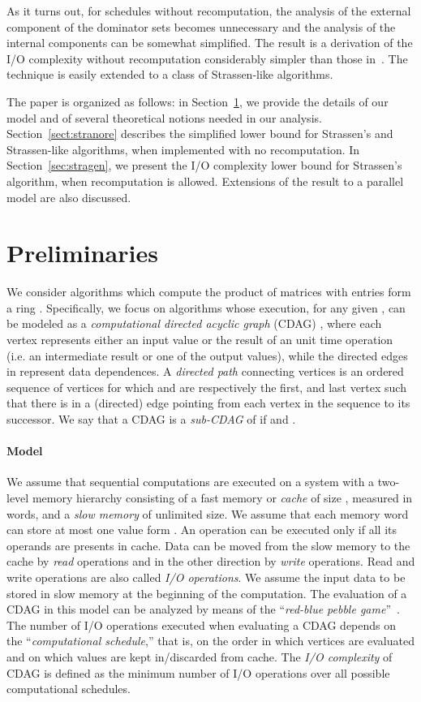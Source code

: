 \documentclass[a4paper,UKenglish]{lipics-v2016}
\newcommand{\io }{I/O }
\begin{document}
As it turns out, for schedules without recomputation, the analysis of
the external component of the dominator sets becomes unnecessary and
the analysis of the internal components can be somewhat simplified.
The result is a derivation of the \io complexity without recomputation
considerably simpler than those in~\cite{ballard2012graph,
  scott2015matrix}.  The technique is easily extended to a class of
Strassen-like algorithms.

The paper is organized as follows: in Section~\ref{sec:preliminaries},
we provide the details of our model and of several theoretical notions
needed in our analysis. Section~\ref{sect:stranore} describes the
simplified lower bound for Strassen's and Strassen-like algorithms,
when implemented with no recomputation. In Section~\ref{sec:stragen}, we present
the \io complexity lower bound for Strassen's algorithm, when
recomputation is allowed. Extensions of the result to a parallel
model are also discussed.


\section{Preliminaries}\label{sec:preliminaries}
We consider algorithms which compute the product  of  matrices  with entries form a ring . Specifically, we
focus on algorithms whose execution, for any given , can be modeled
as a \emph{computational directed acyclic graph} (CDAG) ,
where each vertex  represents either an input value or the
result of an unit time operation (i.e.  an intermediate result or one
of the output values), while the directed edges in  represent data
dependences. A \emph{directed path} connecting vertices  is
an ordered sequence of vertices for which  and  are respectively
the first, and last vertex such that there is in  a (directed) edge
pointing from each vertex in the sequence to its successor. We say
that a CDAG  is a \emph{sub-CDAG} of  if
 and .
\paragraph*{Model}

We assume that sequential computations are executed on a system with a
two-level memory hierarchy consisting of a fast memory or \emph{cache}
of size , measured in words, and a \emph{slow memory} of
unlimited size. We assume that each memory word can store at most one
value form . An operation can be executed only if all its
operands are presents in cache. Data can be moved from the slow memory
to the cache by \emph{read} operations and in the other direction
by \emph{write} operations. Read and write operations are also called
\emph{\io operations}. We assume the input data to be stored in slow
memory at the beginning of the computation. The evaluation of a CDAG in this model can be analyzed by means of the ``\emph{red-blue
  pebble game}''~\cite{jia1981complexity}. The number of \io
operations executed when evaluating a CDAG depends on the
``\emph{computational schedule},'' that is, on the order in which
vertices are evaluated and on which values are kept in/discarded from
cache.  The \emph{\io complexity}  of CDAG  is defined
as the minimum number of \io operations over all possible
computational schedules.
\end{document}
